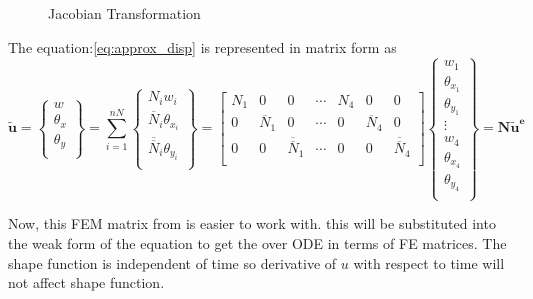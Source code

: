 \documentclass[main.tex]{subfiles}
\begin{document}
\begin{figure}[h!]
\centering


\caption{Jacobian Transformation} 
\label{fig:JacTrans}
\end{figure}

The equation:\ref{eq:approx_disp} is represented in matrix form as 
\begin{equation*}
\tilde{\mathbf{u}}= 
\left\{
\begin{array}{r}
w \\
\theta_x \\
\theta_y \\
\end{array} \right\}
=
\sum_{i=1}^{nN}
\left\{
\begin{array}{r}
N_i w_i \\
\overline{N}_i \theta_{x_i} \\
\overline{\overline{N}}_i \theta_{y_i} \\
\end{array} \right\}
=
\begin{bmatrix}
N_1 & 0 & 0  & \cdots & N_{4} & 0 & 0 \\
0 & \overline{N}_1 & 0  & \cdots & 0 & \overline{N}_{4} & 0 \\
0 & 0 & \overline{\overline{N}}_1 & \cdots & 0 & 0 & \overline{\overline{N}}_{4} \\
\end{bmatrix}
\left\{
\begin{array}{r}
w_1 \\
\theta_{x_1} \\
\theta_{y_1} \\
\vdots \\
w_{4} \\
\theta_{x_{4}} \\
\theta_{y_{4}} \\
\end{array} \right\}
=
\mathbf{N} \mathbf{\tilde{u}^e} 
\end{equation*}

Now, this FEM matrix from is easier to work with. this will be substituted into the weak form of the equation to get the over ODE in terms of FE matrices. The shape function is independent of time so derivative of $u$ with respect to time will not affect shape function.
\end{document}
